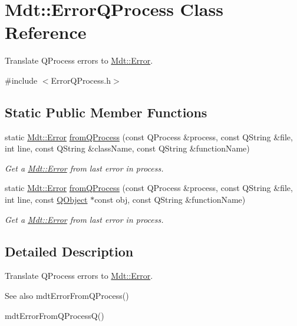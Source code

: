 \hypertarget{class_mdt_1_1_error_q_process}{}\section{Mdt\+:\+:Error\+Q\+Process Class Reference}
\label{class_mdt_1_1_error_q_process}


Translate Q\+Process errors to \hyperlink{class_mdt_1_1_error}{Mdt\+::\+Error}.  




{\ttfamily \#include $<$Error\+Q\+Process.\+h$>$}

\subsection*{Static Public Member Functions}
\begin{DoxyCompactItemize}
\item 
static \hyperlink{class_mdt_1_1_error}{Mdt\+::\+Error} \hyperlink{class_mdt_1_1_error_q_process_a2dda98dd359be476ce2039c5a5a9c157}{from\+Q\+Process} (const Q\+Process \&process, const Q\+String \&file, int line, const Q\+String \&class\+Name, const Q\+String \&function\+Name)
\begin{DoxyCompactList}\small\item\em Get a \hyperlink{class_mdt_1_1_error}{Mdt\+::\+Error} from last error in {\itshape process}. \end{DoxyCompactList}\item 
static \hyperlink{class_mdt_1_1_error}{Mdt\+::\+Error} \hyperlink{class_mdt_1_1_error_q_process_a013ef5e5f23c26375845ef9e925adef3}{from\+Q\+Process} (const Q\+Process \&process, const Q\+String \&file, int line, const \hyperlink{class_q_object}{Q\+Object} $\ast$const obj, const Q\+String \&function\+Name)
\begin{DoxyCompactList}\small\item\em Get a \hyperlink{class_mdt_1_1_error}{Mdt\+::\+Error} from last error in {\itshape process}. \end{DoxyCompactList}\end{DoxyCompactItemize}


\subsection{Detailed Description}
Translate Q\+Process errors to \hyperlink{class_mdt_1_1_error}{Mdt\+::\+Error}. 

\begin{DoxySeeAlso}{See also}
mdt\+Error\+From\+Q\+Process() 

mdt\+Error\+From\+Q\+Process\+Q() 
\end{DoxySeeAlso}


